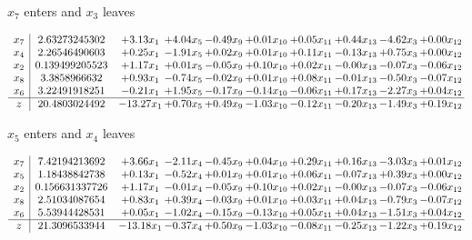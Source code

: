 \documentclass[9pt]{article}
\begin{document}
 $ x_{7} $ enters and $ x_{3} $ leaves 

 \[\begin{array}{c| c c@{\hskip 2pt} c@{\hskip 2pt} c@{\hskip 2pt} c@{\hskip 2pt} c@{\hskip 2pt} c@{\hskip 2pt} c@{\hskip 2pt} c@{\hskip 2pt} }
 x_{7}   &  2.63273245302 & +  3.13 x_{1} & +  4.04 x_{5} & -0.49 x_{9} & +  0.01 x_{10} & +  0.05 x_{11} & +  0.44 x_{13} & -4.62 x_{3} & +  0.00 x_{12}\\
 x_{4}   &  2.26546490603 & +  0.25 x_{1} & -1.91 x_{5} & +  0.02 x_{9} & +  0.01 x_{10} & +  0.11 x_{11} & -0.13 x_{13} & +  0.75 x_{3} & +  0.00 x_{12}\\
 x_{2}   &  0.139499205523 & +  1.17 x_{1} & +  0.01 x_{5} & -0.05 x_{9} & +  0.10 x_{10} & +  0.02 x_{11} & -0.00 x_{13} & -0.07 x_{3} & -0.06 x_{12}\\
 x_{8}   &  3.3858966632 & +  0.93 x_{1} & -0.74 x_{5} & -0.02 x_{9} & +  0.01 x_{10} & +  0.08 x_{11} & -0.01 x_{13} & -0.50 x_{3} & -0.07 x_{12}\\
 x_{6}   &  3.22491918251 & -0.21 x_{1} & +  1.95 x_{5} & -0.17 x_{9} & -0.14 x_{10} & -0.06 x_{11} & +  0.17 x_{13} & -2.27 x_{3} & +  0.04 x_{12}\\
\hline
z    &  20.4803024492 & -13.27 x_{1} & +  0.70 x_{5} & +  0.49 x_{9} & -1.03 x_{10} & -0.12 x_{11} & -0.20 x_{13} & -1.49 x_{3} & +  0.19 x_{12}\\
\end{array}\]


 $ x_{5} $ enters and $ x_{4} $ leaves 

 \[\begin{array}{c| c c@{\hskip 2pt} c@{\hskip 2pt} c@{\hskip 2pt} c@{\hskip 2pt} c@{\hskip 2pt} c@{\hskip 2pt} c@{\hskip 2pt} c@{\hskip 2pt} }
 x_{7}   &  7.42194213692 & +  3.66 x_{1} & -2.11 x_{4} & -0.45 x_{9} & +  0.04 x_{10} & +  0.29 x_{11} & +  0.16 x_{13} & -3.03 x_{3} & +  0.01 x_{12}\\
 x_{5}   &  1.18438842738 & +  0.13 x_{1} & -0.52 x_{4} & +  0.01 x_{9} & +  0.01 x_{10} & +  0.06 x_{11} & -0.07 x_{13} & +  0.39 x_{3} & +  0.00 x_{12}\\
 x_{2}   &  0.156631337726 & +  1.17 x_{1} & -0.01 x_{4} & -0.05 x_{9} & +  0.10 x_{10} & +  0.02 x_{11} & -0.00 x_{13} & -0.07 x_{3} & -0.06 x_{12}\\
 x_{8}   &  2.51034087654 & +  0.83 x_{1} & +  0.39 x_{4} & -0.03 x_{9} & +  0.01 x_{10} & +  0.03 x_{11} & +  0.04 x_{13} & -0.79 x_{3} & -0.07 x_{12}\\
 x_{6}   &  5.53944428531 & +  0.05 x_{1} & -1.02 x_{4} & -0.15 x_{9} & -0.13 x_{10} & +  0.05 x_{11} & +  0.04 x_{13} & -1.51 x_{3} & +  0.04 x_{12}\\
\hline
z    &  21.3096533944 & -13.18 x_{1} & -0.37 x_{4} & +  0.50 x_{9} & -1.03 x_{10} & -0.08 x_{11} & -0.25 x_{13} & -1.22 x_{3} & +  0.19 x_{12}\\
\end{array}\]
\end{document}
